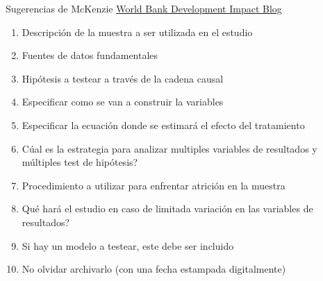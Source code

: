 \documentclass{beamer}
\begin{document}
\begin{frame}{Sugerencias de McKenzie}
\href{http://blogs.worldbank.org/impactevaluations/a-pre-analysis-plan-checklist}{World Bank Development Impact Blog}

\begin{enumerate}[<.->]
\item
Descripción de la muestra a ser utilizada en el estudio
\item
 Fuentes de datos fundamentales
\item
Hipótesis a testear a través de la cadena causal
\item
Especificar como se van a construir la variables
\item
Especificar la ecuación donde se estimará el efecto del tratamiento 
\item
Cúal es la estrategia para analizar multiples variables de resultados y múltiples test de hipótesis?
\item
Procedimiento a utilizar para enfrentar atrición en la muestra
\item
Qué hará el estudio en caso de limitada variación en las variables de resultados?
\item
Si hay un modelo a testear, este debe ser incluido
\item
No olvidar archivarlo (con una fecha estampada digitalmente)
\end{enumerate}
\end{frame}

\end{document}
